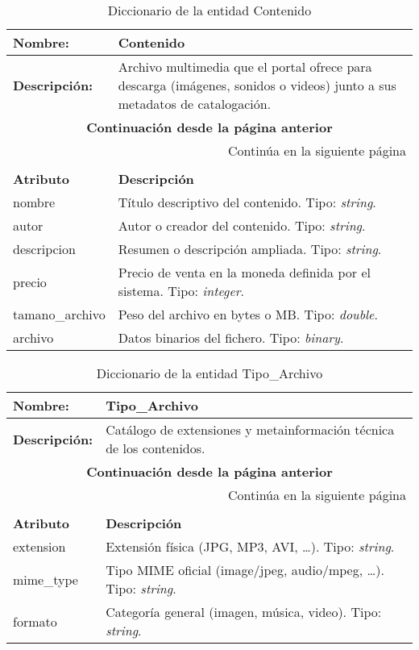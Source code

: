 \renewcommand{\arraystretch}{1.3}
\begin{longtable}{|p{3.5cm}|p{10cm}|}
\caption{Diccionario de la entidad Contenido}
\label{tab:diccionarioContenido} \\ \hline
\textbf{Nombre:} & Contenido \\ \hline
\textbf{Descripción:} & 
Archivo multimedia que el portal ofrece para descarga (imágenes, sonidos o videos) junto a sus metadatos de catalogación. \\ \hline
\endfirsthead
\multicolumn{2}{c}{\textbf{Continuación desde la página anterior}} \\ \hline
\endhead
\hline \multicolumn{2}{r}{{Continúa en la siguiente página}} \\ \hline
\endfoot
\hline
\endlastfoot
\multicolumn{2}{|p{13.5cm}|}{\textbf{ATRIBUTOS}} \\ \hline
\textbf{Atributo} & \textbf{Descripción} \\ \hline
nombre          & Título descriptivo del contenido.  
Tipo: \textit{string}. \\ \hline
autor           & Autor o creador del contenido.  
Tipo: \textit{string}. \\ \hline
descripcion     & Resumen o descripción ampliada.  
Tipo: \textit{string}. \\ \hline
precio          & Precio de venta en la moneda definida por el sistema.  
Tipo: \textit{integer}. \\ \hline
tamano\_archivo & Peso del archivo en bytes o MB.  
Tipo: \textit{double}. \\ \hline
archivo         & Datos binarios del fichero.  
Tipo: \textit{binary}. \\ \hline
\end{longtable}

\renewcommand{\arraystretch}{1.3}
\begin{longtable}{|p{3.5cm}|p{10cm}|}
\caption{Diccionario de la entidad Tipo\_Archivo}
\label{tab:diccionarioTipoArchivo} \\ \hline
\textbf{Nombre:} & Tipo\_Archivo \\ \hline
\textbf{Descripción:} & 
Catálogo de extensiones y metainformación técnica de los contenidos. \\ \hline
\endfirsthead
\multicolumn{2}{c}{\textbf{Continuación desde la página anterior}} \\ \hline
\endhead
\hline \multicolumn{2}{r}{{Continúa en la siguiente página}} \\ \hline
\endfoot
\hline
\endlastfoot
\multicolumn{2}{|p{13.5cm}|}{\textbf{ATRIBUTOS}} \\ \hline
\textbf{Atributo} & \textbf{Descripción} \\ \hline
extension  & Extensión física (JPG, MP3, AVI, …).  
Tipo: \textit{string}. \\ \hline
mime\_type & Tipo MIME oficial (image/jpeg, audio/mpeg, …).  
Tipo: \textit{string}. \\ \hline
formato    & Categoría general (imagen, música, video).  
Tipo: \textit{string}. \\ \hline
\end{longtable}

